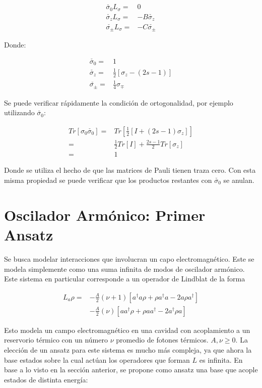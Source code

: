 \documentclass[a4paper,10pt]{report}
\begin{document}
\begin{align}
\check{\sigma_0} L_\sigma  =& 0 \\
\check{\sigma_z} L_\sigma =& -B \check{\sigma_z} \\
\check{\sigma_{\pm}} L_\sigma =& -C \check{\sigma_{\pm}}
\end{align}

Donde:

\begin{align*}
\check{\sigma_0} =& 1\\
\check{\sigma_z} =& \frac{1}{2}[\sigma_z-(2s-1)]\\
\check{\sigma_{\pm}} =& \frac{1}{4}\sigma_{\mp}
\end{align*}

Se puede verificar rápidamente la condición de ortogonalidad, por ejemplo utilizando $\check{\sigma_0}$:

\begin{align*}
Tr[\sigma_0\check{\sigma_0}] =& Tr[\frac{1}{2}[I + (2s-1)\sigma_z]]\\
=& \frac{1}{2} Tr[I] + \frac{2s-1}{2}Tr[\sigma_z]\\
=& 1
\end{align*}

Donde se utiliza el hecho de que las matrices de Pauli tienen traza cero. Con esta misma propiedad se puede verificar que los productos restantes con $\check{\sigma_0}$ se anulan.

\section{Oscilador Armónico: Primer Ansatz}

Se busca modelar interacciones que involucran un capo electromagnético. Este se modela simplemente como una suma infinita de modos de oscilador armónico. Este sistema en particular corresponde a un operador de Lindblat de la forma \cite{EnglertDB}

\begin{align}\label{EMField}
L_a \rho =& - \frac{A}{2}(\nu + 1)[a^\dagger a\rho + \rho a^\dagger a -2a\rho a^\dagger] \nonumber \\
 &- \frac{A}{2}(\nu)[ aa^\dagger\rho + \rho  aa^\dagger -2a^\dagger\rho a]
\end{align}

Esto modela un campo electromagnético en una cavidad con acoplamiento a un reservorio térmico con un número $\nu$ promedio de fotones térmicos. $A,\nu \geq 0$. La elección de un ansatz para este sistema es mucho más compleja, ya que ahora la base estados sobre la cual actúan los operadores que forman $L$ es infinita.  En base a lo visto en la sección anterior, se propone como ansatz una base que acople estados de distinta energía:
\end{document}
